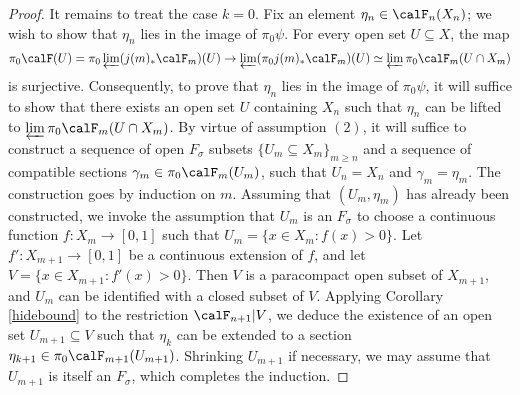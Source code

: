 \begin{proof}
It remains to treat the case $k=0$. Fix an element $\eta_n \in \calF_n(X_n)$; we wish to show that
$\eta_n$ lies in the image of $\pi_0 \psi$. For every open set $U \subseteq X$,
the map
$$ \pi_0 \calF(U) = \pi_0 \varprojlim (j(m)_{\ast} \calF_m)(U)
\rightarrow \varprojlim (\pi_0 j(m)_{\ast} \calF_m)(U)
\simeq \varprojlim \pi_0 \calF_m( U \cap X_m)$$
is surjective. Consequently, to prove that $\eta_n$ lies in the image of
$\pi_0 \psi$, it will suffice to show that there exists an open set $U$ containing $X_n$
such that $\eta_n$ can be lifted to $\varprojlim \pi_0 \calF_m(U \cap X_m)$. 
By virtue of assumption $(2)$, it will suffice to construct a sequence of
open $F_{\sigma}$ subsets $\{ U_{m} \subseteq X_m \}_{m \geq n}$ and a sequence of compatible
sections $\gamma_{m} \in \pi_0 \calF_m(U_m)$, such that $U_n = X_n$ and
$\gamma_m = \eta_m$. The construction goes by induction on $m$. Assuming that
$(U_m, \eta_m)$ has already been constructed, we invoke the assumption that
$U_m$ is an $F_{\sigma}$ to choose a continuous function $f: X_m \rightarrow [0,1]$ such that
$U_m = \{ x \in X_m: f(x) > 0 \}$. Let $f': X_{m+1} \rightarrow [0,1]$ be a continuous extension of
$f$, and let $V = \{ x \in X_{m+1}: f'(x) > 0 \}$. Then $V$ is a paracompact open subset of $X_{m+1}$, and $U_{m}$ can be identified with a closed subset of $V$. Applying Corollary \ref{hidebound} to the restriction $\calF_{n+1} | V$, we deduce the existence of an open set $U_{m+1} \subseteq V$
such that $\eta_{k}$ can be extended to a section $\eta_{k+1} \in \pi_0 \calF_{m+1}(U_{m+1})$. 
Shrinking $U_{m+1}$ if necessary, we may assume that $U_{m+1}$ is itself an $F_{\sigma}$, which completes the induction.
\end{proof}

